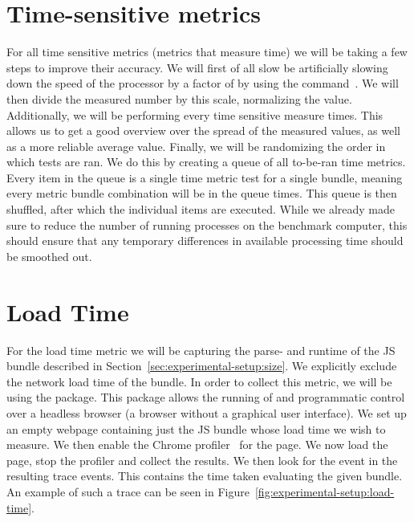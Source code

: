\section{Time-sensitive metrics}\label{sec:experimental-setup:time-sensitive-metrics}
For all time sensitive metrics (metrics that measure time) we will be taking a few steps to improve their accuracy. We will first of all slow be artificially slowing down the speed of the processor by a factor of \slowdownFactor{} by using the  command~. We will then divide the measured number by this scale, normalizing the value. Additionally, we will be performing every time sensitive measure \numMeasures{} times. This allows us to get a good overview over the spread of the measured values, as well as a more reliable average value. Finally, we will be randomizing the order in which tests are ran. We do this by creating a queue of all to-be-ran time metrics. Every item in the queue is a single time metric test for a single bundle, meaning every metric bundle combination will be in the queue \numMeasures{} times. This queue is then shuffled, after which the individual items are executed. While we already made sure to reduce the number of running processes on the benchmark computer, this should ensure that any temporary differences in available processing time should be smoothed out.

\section{Load Time}\label{sec:experimental-setup:load-time}
For the load time metric we will be capturing the parse- and runtime of the JS bundle described in Section~\ref{sec:experimental-setup:size}. We explicitly exclude the network load time of the bundle. In order to collect this metric, we will be using the  package. This package allows the running of and programmatic control over a headless browser (a browser without a graphical user interface). We set up an empty webpage containing just the JS bundle whose load time we wish to measure. We then enable the Chrome profiler~ for the page. We now load the page, stop the profiler and collect the results. We then look for the  event in the resulting trace events. This contains the time taken evaluating the given bundle. An example of such a trace can be seen in Figure~\ref{fig:experimental-setup:load-time}.

